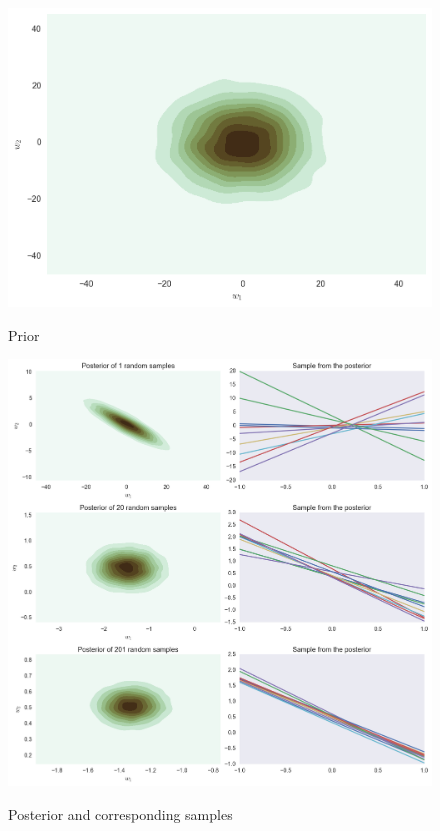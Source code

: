 \documentclass[12pt]{article}
\newenvironment{question}[2][Question]{\begin{trivlist}
\kern10pt
\item[\hskip \labelsep {\bfseries #1}\hskip \labelsep {\bfseries #2.}]}{\end{trivlist}}
\begin{document}
\begin{question}{11}
\begin{figure}
\caption{Prior}
\includegraphics[scale=.6]{prior}
\centering
\label{prior}
\end{figure}

\begin{figure}
\caption{Posterior and corresponding samples}
\includegraphics[scale=.6]{posterior_sample}
\centering
\label{posterior_sample}
\end{figure}

\end{question}
\end{document}

